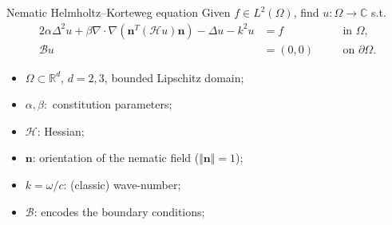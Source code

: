 \documentclass[11pt,aspectratio=169,xcolor=dvipsnames]{beamer}
\begin{document}
\begin{frame}{Nematic Helmholtz--Korteweg equation\footnotemark}
  Given $f \in L^2(\Omega)$, find $u : \Omega \to \mathbb{C}$ s.t. 
  \begin{alignat*}{2}
    \alpha \Delta^2 u + \beta \nabla \cdot \nabla(\bm{n}^T (\mathcal{H} u) \bm{n}) - \Delta u - k^2 u &= f \quad &&\text{in } \Omega, \\
    \mathcal{B}u &= (0,0) \quad &&\text{on } \partial \Omega.
  \end{alignat*}
  \begin{itemize}
    \item $\Omega \subset \mathbb{R}^d$, $d = 2,3$, bounded Lipschitz domain;
    \item $\alpha, \beta:$ constitution parameters;
    \item $\mathcal{H}$: Hessian;
    \item $\bm{n}$: orientation of the nematic field ($\Vert \bm{n} \Vert = 1$);
    \item $k = \omega / c$: (classic) wave-number;
    \item $\mathcal{B}$: encodes the boundary conditions;
  \end{itemize}
  \begin{center}
  \end{center}
\end{frame}
\end{document}
